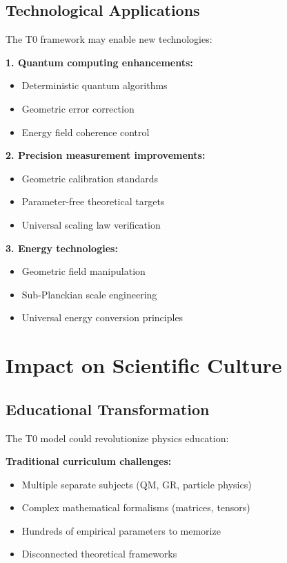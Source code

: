 \documentclass[12pt,a4paper]{report}
\begin{document}
\subsection{Technological Applications}
\label{subsec:technological_applications}

The T0 framework may enable new technologies:

\textbf{1. Quantum computing enhancements:}
\begin{itemize}
	\item Deterministic quantum algorithms
	\item Geometric error correction
	\item Energy field coherence control
\end{itemize}

\textbf{2. Precision measurement improvements:}
\begin{itemize}
	\item Geometric calibration standards
	\item Parameter-free theoretical targets
	\item Universal scaling law verification
\end{itemize}

\textbf{3. Energy technologies:}
\begin{itemize}
	\item Geometric field manipulation
	\item Sub-Planckian scale engineering
	\item Universal energy conversion principles
\end{itemize}

\section{Impact on Scientific Culture}
\label{sec:impact_scientific_culture}

\subsection{Educational Transformation}
\label{subsec:educational_transformation}

The T0 model could revolutionize physics education:

\textbf{Traditional curriculum challenges:}
\begin{itemize}
	\item Multiple separate subjects (QM, GR, particle physics)
	\item Complex mathematical formalisms (matrices, tensors)
	\item Hundreds of empirical parameters to memorize
	\item Disconnected theoretical frameworks
\end{itemize}
\end{document}
